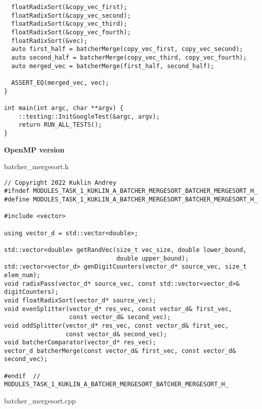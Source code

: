 \documentclass{report}
\begin{document}
\begin{lstlisting}
  floatRadixSort(&copy_vec_first);
  floatRadixSort(&copy_vec_second);
  floatRadixSort(&copy_vec_third);
  floatRadixSort(&copy_vec_fourth);
  floatRadixSort(&vec);
  auto first_half = batcherMerge(copy_vec_first, copy_vec_second);
  auto second_half = batcherMerge(copy_vec_third, copy_vec_fourth);
  auto merged_vec = batcherMerge(first_half, second_half);

  ASSERT_EQ(merged_vec, vec);
}

int main(int argc, char **argv) {
    ::testing::InitGoogleTest(&argc, argv);
    return RUN_ALL_TESTS();
}
\end{lstlisting}

\textbf{OpenMP version}
\par batcher\_mergesort.h
\begin{lstlisting}
// Copyright 2022 Kuklin Andrey
#ifndef MODULES_TASK_1_KUKLIN_A_BATCHER_MERGESORT_BATCHER_MERGESORT_H_
#define MODULES_TASK_1_KUKLIN_A_BATCHER_MERGESORT_BATCHER_MERGESORT_H_

#include <vector>

using vector_d = std::vector<double>;

std::vector<double> getRandVec(size_t vec_size, double lower_bound,
                               double upper_bound);
std::vector<vector_d> genDigitCounters(vector_d* source_vec, size_t elem_num);
void radixPass(vector_d* source_vec, const std::vector<vector_d>& digitCounters);
void floatRadixSort(vector_d* source_vec);
void evenSplitter(vector_d* res_vec, const vector_d& first_vec,
                  const vector_d& second_vec);
void oddSplitter(vector_d* res_vec, const vector_d& first_vec,
                 const vector_d& second_vec);
void batcherComparator(vector_d* res_vec);
vector_d batcherMerge(const vector_d& first_vec, const vector_d& second_vec);

#endif  // MODULES_TASK_1_KUKLIN_A_BATCHER_MERGESORT_BATCHER_MERGESORT_H_
\end{lstlisting}
\par batcher\_mergesort.cpp
\end{document}
